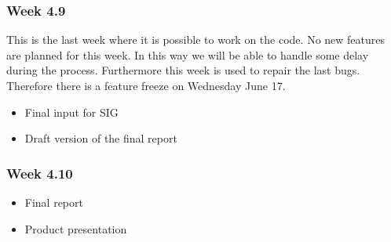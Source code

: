 \subsubsection{Week 4.9}
	This is the last week where it is possible to work on the code. No new features are planned for this week. In this way we will be able to handle some delay during the process. Furthermore this week is used to repair the last bugs. Therefore there is a feature freeze on Wednesday June 17. 
\begin{itemize}
	\item Final input for SIG
	\item Draft version of the final report
\end{itemize}
\subsubsection{Week 4.10}
\begin{itemize}
	\item Final report
	\item Product presentation
\end{itemize}